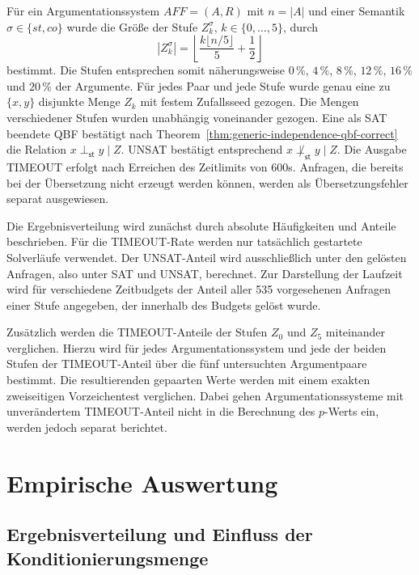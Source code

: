 Für ein Argumentationssystem \(AF F =(A,R)\) mit \(n=|A|\) und einer Semantik \(\sigma \in \{st, co\}\) 
wurde die Größe der Stufe \(Z_k^{\sigma}\), \(k\in\{0,\ldots,5\}\), durch
\[
    |Z_k^{\sigma}|
    =
    \left\lfloor
        \frac{k\lfloor n/5\rfloor}{5}+\frac{1}{2}
    \right\rfloor
\]
bestimmt. Die Stufen entsprechen somit näherungsweise \(0\,\%\),
\(4\,\%\), \(8\,\%\), \(12\,\%\), \(16\,\%\) und \(20\,\%\) der Argumente.
Für jedes Paar und jede Stufe wurde genau
eine zu \(\{x,y\}\) disjunkte Menge \(Z_k\) mit festem Zufallsseed gezogen.
Die Mengen verschiedener Stufen wurden unabhängig voneinander gezogen.
Eine als SAT beendete QBF bestätigt nach
Theorem~\ref{thm:generic-independence-qbf-correct} die Relation
\(x\perp_{\mathsf{st}}y\mid Z\). UNSAT bestätigt entsprechend
\(x\not\perp_{\mathsf{st}}y\mid Z\). Die Ausgabe TIMEOUT erfolgt nach Erreichen des Zeitlimits von 600s. 
Anfragen, die bereits bei der Übersetzung nicht erzeugt werden können, werden als
Übersetzungsfehler separat ausgewiesen.

Die Ergebnisverteilung wird zunächst durch absolute Häufigkeiten und
Anteile beschrieben. Für die TIMEOUT-Rate werden nur tatsächlich gestartete
Solverläufe verwendet.
Der UNSAT-Anteil wird ausschließlich unter den gelösten Anfragen, also unter
SAT und UNSAT, berechnet. Zur Darstellung der Laufzeit wird für verschiedene
Zeitbudgets der Anteil aller 535 vorgesehenen Anfragen einer Stufe
angegeben, der innerhalb des Budgets gelöst wurde.

Zusätzlich werden die TIMEOUT-Anteile der Stufen \(Z_0\) und \(Z_5\)
miteinander verglichen. Hierzu wird für jedes Argumentationssystem und
jede der beiden Stufen der TIMEOUT-Anteil über die fünf untersuchten
Argumentpaare bestimmt. Die resultierenden gepaarten Werte werden mit
einem exakten zweiseitigen Vorzeichentest verglichen. Dabei gehen
Argumentationssysteme mit unverändertem TIMEOUT-Anteil nicht in die
Berechnung des \(p\)-Werts ein, werden jedoch separat berichtet.
\fi

\section{Empirische Auswertung}
\label{sec:empirical-analysis}
\subsection{Ergebnisverteilung und Einfluss der Konditionierungsmenge}
\label{subsec:empirical-stable-z-status}

